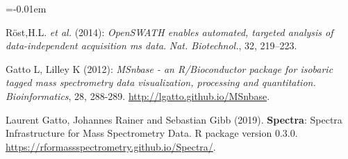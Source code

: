 \documentclass{article}
\begin{document}
\begin{multicols}{2}
\noindent
\begin{minipage}[t]{.8\linewidth}

  \vspace{1cm}

  \small

  
  \begin{thebibliography}{1}
    \itemsep=-0.01em
    \setlength{\baselineskip}{0.4em}

   Röst,H.L. \textit{et al.} (2014):
    \emph{OpenSWATH enables automated, targeted analysis of
      data-independent acquisition ms
      data}. \textit{Nat. Biotechnol.}, 32, 219–223.

   Gatto L, Lilley K (2012): \emph{MSnbase - an
    R/Bioconductor package for isobaric tagged mass spectrometry data
    visualization, processing and quantitation.}
    \textit{Bioinformatics}, 28,
    288-289. \url{http://lgatto.github.io/MSnbase}.

    Laurent Gatto, Johannes Rainer and Sebastian Gibb
     (2019). \textbf{Spectra}: Spectra Infrastructure for Mass
     Spectrometry Data. R package version
     0.3.0. \url{https://rformassspectrometry.github.io/Spectra/}.
  \end{thebibliography}

\end{minipage}




\end{multicols}
\end{document}
